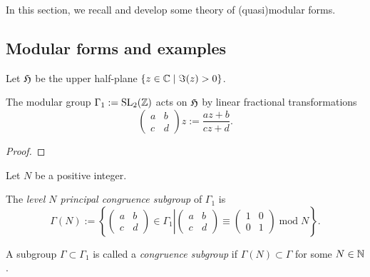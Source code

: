 In this section, we recall and develop some theory of (quasi)modular forms.

\subsection{Modular forms and examples}

Let $\mathfrak{H}$ be the upper half-plane $\{z\in\mathbb{C}\mid\Im(z)>0\}$.
\begin{lemma}\label{def:Gamma-1-Action}\leanok
    The modular group $\Gamma_1:=\mathrm{SL}_2(\mathbb{Z})$ acts on $\mathfrak{H}$ by linear fractional transformations
$$\left(\begin{smallmatrix}a&b\\c&d\end{smallmatrix}\right)z:=\frac{az+b}{cz+d}.$$
\end{lemma}
\begin{proof}
    \leanok
\end{proof}

Let $N$ be a positive integer.
\begin{definition}\label{def:level-N-princ-cong-subgp}\leanok
The \emph{level $N$ principal congruence subgroup} of $\Gamma_1$ is
$$
    \Gamma(N):=\left\{\left.\left(\begin{smallmatrix}a&b\\c&d\end{smallmatrix}\right)\in\Gamma_1\right|\left(\begin{smallmatrix}a&b\\c&d\end{smallmatrix}\right)\equiv\left(\begin{smallmatrix}1&0\\0&1\end{smallmatrix}\right)\;\mathrm{mod}\;N\right\}.
$$
\end{definition}

\begin{definition}\label{def:congruence-subgroup}\leanok
    A subgroup $\Gamma\subset\Gamma_1$ is called a \emph{congruence subgroup} if $\Gamma(N)\subset\Gamma$ for some $N\in\mathbb{N}$.
\end{definition}

